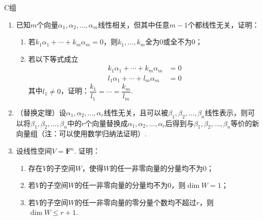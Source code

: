 \centerline{\heiti C组}
\begin{enumerate}
    \item 已知$m$个向量$\alpha_1,\alpha_2,\ldots,\alpha_m$线性相关，但其中任意$m-1$个都线性无关，证明：
          \begin{enumerate}
              \item 若$k_1\alpha_1+\cdots+k_m\alpha_m=0$，则$k_1,\ldots,k_m$全为0或全不为0；

              \item 若以下等式成立
                    \begin{align*}
                        k_1\alpha_1+\cdots+k_m\alpha_m & =0 \\
                        l_1\alpha_1+\cdots+l_m\alpha_m & =0
                    \end{align*}
                    其中$l_1\neq 0$，证明：$\dfrac{k_1}{l_1}=\cdots=\dfrac{k_m}{l_m}$.
          \end{enumerate}

    \item （替换定理）设$\alpha_1,\alpha_2,\ldots,\alpha_r$线性无关，且可以被$\beta_1,\beta_2,\ldots,\beta_n$线性表示，则可以将$\beta_1,\beta_2,\ldots,\beta_n$中的$r$个向量替换成$\alpha_1,\alpha_2,\ldots,\alpha_r$后得到与$\beta_1,\beta_2,\ldots,\beta_n$等价的新向量组（注：可以使用数学归纳法证明）.

    \item 设线性空间$V=\mathbf{F}^n$. 证明：
          \begin{enumerate}
              \item 存在$V$的子空间$W$，使得$W$的任一非零向量的分量均不为0；

              \item 若$V$的子空间$W$的任一非零向量的分量均不为0，则$\dim W=1$；

              \item 若$V$的子空间$W$的任一非零向量的零分量个数均不超过$r$，则$\dim W \leqslant r+1$.
          \end{enumerate}
\end{enumerate}
